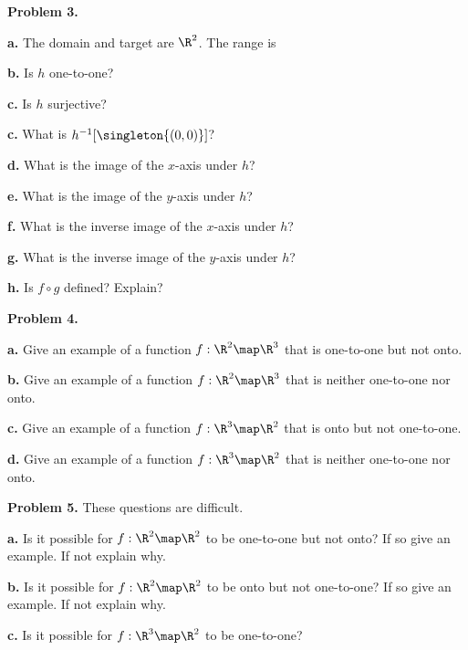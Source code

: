 \documentclass[oneside,12pt]{amsart}
\begin{document}
\textbf{Problem 3.}

\textbf{a.}  The domain and target are $\R^2$. The range is

\medskip

\textbf{b.} Is $h$ one-to-one?

\medskip

\textbf{c.} Is $h$ surjective?

\medskip

\textbf{c.} What is $h^{-1}[\singleton{(0,0)}]$?

\medskip

\textbf{d.} What is the image of the $x$-axis under $h$?

\medskip

\textbf{e.} What is the image of the $y$-axis under $h$?

\medskip

\textbf{f.} What is the inverse image of the $x$-axis under $h$?

\medskip

\textbf{g.} What is the inverse image of the $y$-axis under $h$?

\medskip

\textbf{h.} Is $f \circ g$ defined? Explain?

\bigskip

\textbf{Problem 4.}
\smallskip

\textbf{a.} Give an example of a function $f:\R^2\map\R^3$ that is
one-to-one but not onto.

\bigskip

\textbf{b.} Give an example of a function $f:\R^2\map\R^3$ that is neither
one-to-one nor onto.

\bigskip

\textbf{c.} Give an example of a function $f:\R^3\map\R^2$ that is
onto but not one-to-one.

\bigskip

\textbf{d.} Give an example of a function $f:\R^3\map\R^2$ that is neither
one-to-one nor onto.


\bigskip

\textbf{Problem 5.} These questions are difficult.
\smallskip

\textbf{a.} Is it possible for $f:\R^2\map\R^2$ to be one-to-one but not onto?
If so give an example. If not explain why.

\bigskip

\textbf{b.} Is it possible for $f:\R^2\map\R^2$ to be onto but not one-to-one?
If so give an example. If not explain why.

\bigskip

\textbf{c.} Is it possible for $f:\R^3\map\R^2$ to be one-to-one?
\end{document}
